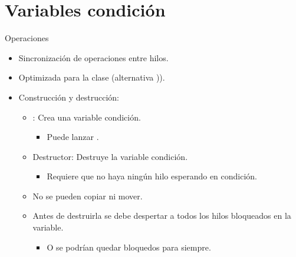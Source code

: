 \section{Variables condición}

\begin{frame}{Operaciones}
\begin{itemize}
  \item Sincronización de operaciones entre hilos.
  \item Optimizada para la clase  (alternativa )).
  \item Construcción y destrucción:
    \begin{itemize}
      \item {}: Crea una variable condición.
        \begin{itemize}
          \item Puede lanzar .
        \end{itemize}
      \item Destructor: Destruye la variable condición.
        \begin{itemize}
         \item Requiere que no haya ningún hilo esperando en condición.
        \end{itemize}
      \item No se pueden copiar ni mover.
      \item Antes de destruirla se debe despertar a todos los hilos bloqueados en la variable.
        \begin{itemize}
          \item O se podrían quedar bloquedos para siempre.
        \end{itemize}
    \end{itemize}
\end{itemize}
\end{frame}

